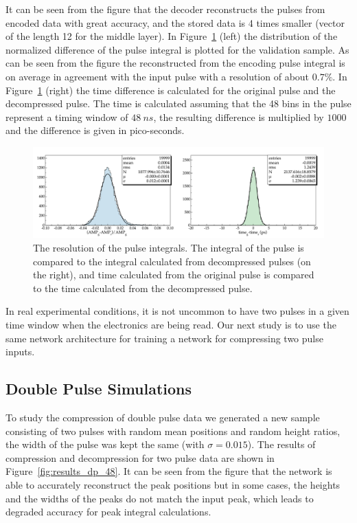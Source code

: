 It can be seen from the figure that the decoder reconstructs the pulses from encoded data with great accuracy, and the stored data is 4 times smaller (vector of the length 12 for the middle layer).
In Figure~\ref{fig:results_sp_48_res} (left) the distribution of the normalized difference of the pulse integral is plotted for the validation sample. As can be seen from the figure the reconstructed from the encoding pulse integral is on average in agreement with the input pulse with a resolution of about $0.7\%$. In Figure~\ref{fig:results_sp_48_res} (right) the time difference is calculated for the original pulse and the decompressed pulse. The time is calculated assuming that the 48 bins in the pulse represent a timing window of $48~ns$, the resulting difference is multiplied by $1000$ and the difference is given in pico-seconds.

\begin{figure}[h!]
\centering
\includegraphics[width=0.9\columnwidth]{out_evaluate_csv_single_24.pdf}
\caption{The resolution of the pulse integrals. The integral of the pulse is compared to the integral calculated from decompressed pulses (on the right), and time calculated from the original pulse is compared to the time calculated from the decompressed pulse.} 
\label{fig:results_sp_48_res}
\end{figure}

In real experimental conditions, it is not uncommon to have two pulses in a given time window when the electronics are being read. Our next study is to use the same network architecture for training a network for compressing two pulse inputs.

\subsection{Double Pulse Simulations}

To study the compression of double pulse data we generated a new sample consisting of two pulses with random mean positions and random height ratios, the width of the pulse was kept the same (with $\sigma=0.015$). The results of compression and decompression for two pulse data are shown in Figure~\ref{fig:results_dp_48}. It can be seen from the figure that the network is able to accurately reconstruct the peak positions but in some cases, the heights and the widths of the peaks do not match the input peak, which leads to degraded accuracy for peak integral calculations. 

